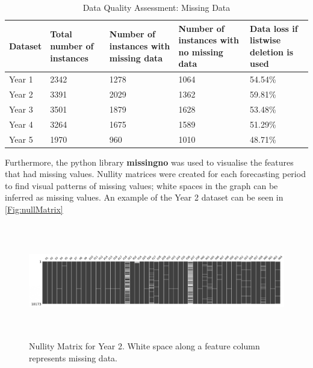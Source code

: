 \begin{table}[h!]
\begin{center}
 \begin{tabular}{|l|p{2.75cm}|p{2.75cm}|p{2.75cm}|p{2.75cm}|} 
 
\hline
 Dataset  & Total number of instances & Number of instances with missing data & Number of instances with no missing data & Data loss if listwise deletion is used
  \\ [0.5ex] 
 \hline\hline
 
Year 1 & 2342 & 1278 & 1064 & 54.54\% \\ \hline
Year 2 & 3391 & 2029 & 1362 & 59.81\% \\ \hline
Year 3 & 3501 & 1879 & 1628 & 53.48\% \\ \hline
Year 4 & 3264 & 1675 & 1589 & 51.29\% \\ \hline
Year 5 & 1970 & 960 & 1010 & 48.71\% \\ \hline
\hline

\end{tabular}
\end{center}

    \caption{Data Quality Assessment: Missing Data}
\label{table:dataLoss}
\end{table}

Furthermore, the python library \textbf{missingno} was used to visualise the features that had missing values. Nullity matrices were created for each forecasting period to find visual patterns of missing values; white spaces in the graph can be inferred as missing values. An example of the Year 2 dataset can be seen in \autoref{Fig:nullMatrix}

\begin{figure}[htp]
\centering
\includegraphics[height=5cm,width=1.0\columnwidth]{Images/nullityMatrix.png}
\caption{Nullity Matrix for Year 2. White space along a feature column represents missing data.}
\label{Fig:nullMatrix}
\end{figure}



